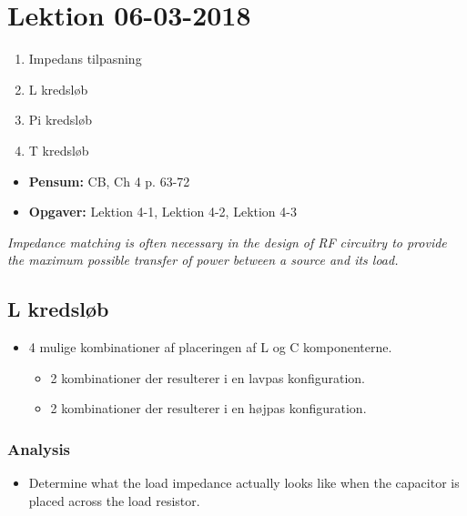 \section{Lektion 06-03-2018}

\begin{enumerate}
	\item Impedans tilpasning
	\item L kredsløb
	\item Pi kredsløb
	\item T kredsløb
\end{enumerate}

\begin{mdframed}[style=exampledefault]
	\begin{itemize}
		\item \textbf{Pensum:} CB, Ch 4 p. 63-72
		\item \textbf{Opgaver:} Lektion 4-1, Lektion 4-2, Lektion 4-3
	\end{itemize}
\end{mdframed}

\noindent\textit{Impedance matching is often necessary in the design of RF circuitry to provide the maximum possible transfer of power	between a source and its load.}

\subsection{L kredsløb}

\begin{itemize}
	\item 4 mulige kombinationer af placeringen af L og C komponenterne.
	\begin{itemize}
		\item 2 kombinationer der resulterer i en lavpas konfiguration.
		\item 2 kombinationer der resulterer i en højpas konfiguration.
	\end{itemize}
\end{itemize}

\subsubsection{Analysis}
\begin{itemize}
	\item Determine what the load impedance actually looks
	like when the capacitor is placed across the load resistor.
\end{itemize}

